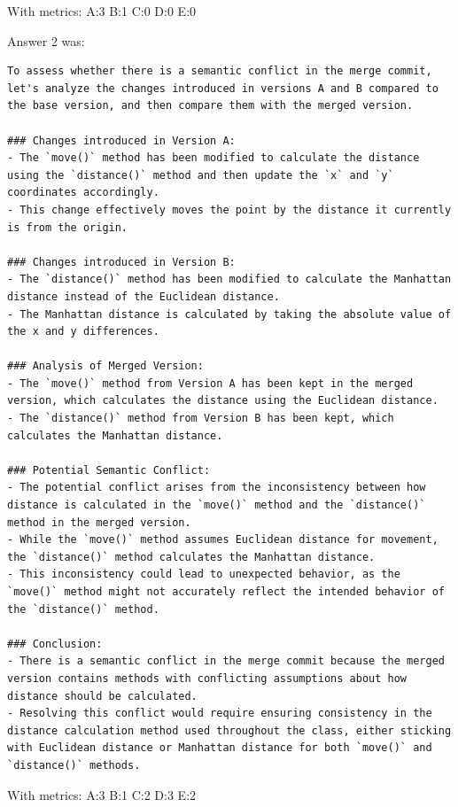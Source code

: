 With metrics:
A:3
B:1
C:0
D:0
E:0



Answer 2 was:
\begin{lstlisting}
To assess whether there is a semantic conflict in the merge commit, let's analyze the changes introduced in versions A and B compared to the base version, and then compare them with the merged version.

### Changes introduced in Version A:
- The `move()` method has been modified to calculate the distance using the `distance()` method and then update the `x` and `y` coordinates accordingly.
- This change effectively moves the point by the distance it currently is from the origin.

### Changes introduced in Version B:
- The `distance()` method has been modified to calculate the Manhattan distance instead of the Euclidean distance.
- The Manhattan distance is calculated by taking the absolute value of the x and y differences.

### Analysis of Merged Version:
- The `move()` method from Version A has been kept in the merged version, which calculates the distance using the Euclidean distance.
- The `distance()` method from Version B has been kept, which calculates the Manhattan distance.

### Potential Semantic Conflict:
- The potential conflict arises from the inconsistency between how distance is calculated in the `move()` method and the `distance()` method in the merged version.
- While the `move()` method assumes Euclidean distance for movement, the `distance()` method calculates the Manhattan distance.
- This inconsistency could lead to unexpected behavior, as the `move()` method might not accurately reflect the intended behavior of the `distance()` method.

### Conclusion:
- There is a semantic conflict in the merge commit because the merged version contains methods with conflicting assumptions about how distance should be calculated.
- Resolving this conflict would require ensuring consistency in the distance calculation method used throughout the class, either sticking with Euclidean distance or Manhattan distance for both `move()` and `distance()` methods.
\end{lstlisting}

With metrics:
A:3
B:1
C:2
D:3
E:2

